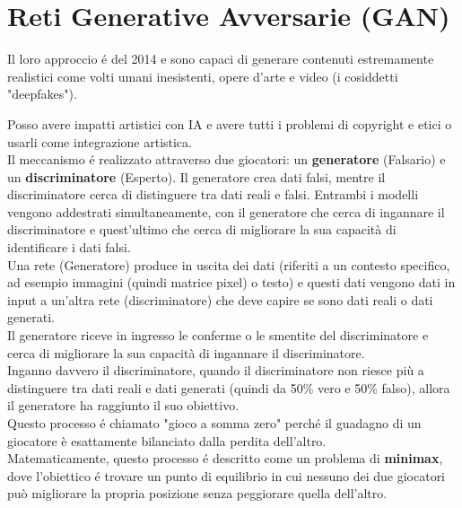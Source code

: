 \section{Reti Generative Avversarie (GAN)}
Il loro approccio é del 2014 e sono capaci di generare contenuti estremamente realistici come volti umani inesistenti, opere d'arte e video (i cosiddetti "deepfakes").

Posso avere impatti artistici con IA e avere tutti i problemi di copyright e etici o usarli come integrazione artistica.\\

Il meccanismo é realizzato attraverso due giocatori: un \textbf{generatore} (Falsario) e un \textbf{discriminatore} (Esperto). Il generatore crea dati falsi, mentre il discriminatore cerca di distinguere tra dati reali e falsi. Entrambi i modelli vengono addestrati simultaneamente, con il generatore che cerca di ingannare il discriminatore e quest'ultimo che cerca di migliorare la sua capacità di identificare i dati falsi.\\

Una rete (Generatore) produce in uscita dei dati (riferiti a un contesto specifico, ad esempio immagini (quindi matrice pixel) o testo) e questi dati vengono dati in input a un'altra rete (discriminatore) che deve capire se sono dati reali o dati generati.\\

Il generatore riceve in ingresso le conferme o le smentite del discriminatore e cerca di migliorare la sua capacità di ingannare il discriminatore.\\

Inganno davvero il discriminatore, quando il discriminatore non riesce più a distinguere tra dati reali e dati generati (quindi da 50\% vero e 50\% falso), allora il generatore ha raggiunto il suo obiettivo.\\

Questo processo é chiamato "gioco a somma zero" perché il guadagno di un giocatore è esattamente bilanciato dalla perdita dell'altro.\\

Matematicamente, questo processo é descritto come un problema di \textbf{minimax}, dove l'obiettico é trovare un punto di equilibrio in cui nessuno dei due giocatori può migliorare la propria posizione senza peggiorare quella dell'altro.\\

